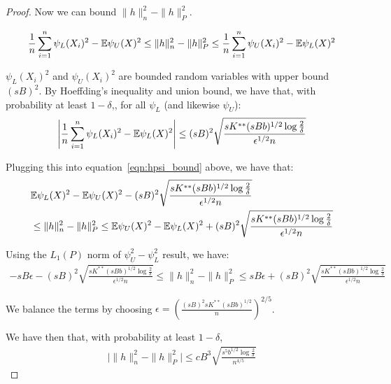 \begin{proof}

Now we can bound $\| h \|_n^2 - \| h \|_P^2$.

\begin{align}
\frac{1}{n} \sum_{i=1}^n \psi_L(X_i)^2 - {\mathbb E} \psi_U(X)^2  \leq
    \| h \|_n^2 - \| h \|_P^2 \leq
  \frac{1}{n} \sum_{i=1}^n \psi_U(X_i)^2 - {\mathbb E} \psi_L(X)^2  \label{eqn:hpsi_bound}
\end{align}

$\psi_L(X_i)^2$ and $\psi_U(X_i)^2$ are bounded random variables with upper bound $(sB)^2$. By Hoeffding's inequality and union bound, we have that, with probability at least $1-\delta$,, for all $\psi_L$ (and likewise $\psi_U$):
\[
\left| \frac{1}{n} \sum_{i=1}^n \psi_L(X_i)^2 - 
   {\mathbb E} \psi_L(X)^2 \right| \leq (sB)^2 \sqrt{ \frac{ sK^{**} (sBb)^{1/2} \log \frac{2}{\delta}}{ \epsilon^{1/2} n} }
\]

Plugging this into equation~\ref{eqn:hpsi_bound} above, we have that:
\begin{align*}
& {\mathbb E} \psi_L(X)^2 - {\mathbb E} \psi_U(X)^2 - 
(sB)^2 \sqrt{ \frac{ sK^{**} (sBb)^{1/2} \log \frac{2}{\delta}}{ \epsilon^{1/2} n} } \\
 & \leq 
 \| h \|_n^2 - \| h \|_P^2 \leq
{\mathbb E} \psi_U(X)^2 - {\mathbb E} \psi_L(X)^2 + 
(sB)^2 \sqrt{ \frac{ sK^{**} (sBb)^{1/2} \log \frac{2}{\delta}}{ \epsilon^{1/2} n} }
\end{align*}

Using the $L_1(P)$ norm of $\psi_U^2 - \psi_L^2$ result, we have:
\begin{align*}
-sB\epsilon - 
(sB)^2 \sqrt{ \frac{ sK^{**} (sBb)^{1/2} \log \frac{2}{\delta}}{ \epsilon^{1/2} n} } \leq 
 \| h \|_n^2 - \| h \|_P^2 \leq
sB\epsilon + 
(sB)^2 \sqrt{ \frac{ sK^{**} (sBb)^{1/2} \log \frac{2}{\delta}}{ \epsilon^{1/2} n} }
\end{align*}

We balance the terms by choosing $\epsilon = \left( \frac{ (sB)^2 sK^{**} (sBb)^{1/2}}{n} \right)^{2/5}$.

We have then that, with probability at least $1-\delta$,
\begin{align*}
\big| \| h \|_n^2 - \| h \|_P^2  \big| \leq
  c B^3 \sqrt{ \frac{s^5 b^{1/2} \log \frac{2}{\delta}}{n^{4/5}}}
\end{align*}


\end{proof}
